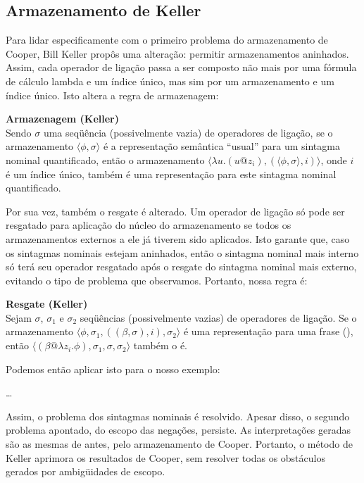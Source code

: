 \subsection{Armazenamento de Keller}
Para lidar especificamente com o primeiro problema do armazenamento de Cooper, Bill Keller propôs uma alteração: permitir armazenamentos aninhados. Assim, cada operador de ligação passa a ser composto não mais por uma fórmula de cálculo lambda e um índice único, mas sim por um armazenamento e um índice único. Isto altera a regra de armazenagem:

\begin{oframed}\textbf{Armazenagem (Keller)}\\
Sendo $\sigma$ uma seqüência (possivelmente vazia) de operadores de ligação, se o armazenamento $\langle\phi, \sigma\rangle$ é a representação semântica ``usual'' para um sintagma nominal quantificado, então o armazenamento $\langle\lambda u.(u@z_i), (\langle \phi, \sigma \rangle, i) \rangle $, onde $i$ é um índice único, também é uma representação para este sintagma nominal quantificado.
\end{oframed}

Por sua vez, também o resgate é alterado. Um operador de ligação só pode ser resgatado para aplicação do núcleo do armazenamento se todos os armazenamentos externos a ele já tiverem sido aplicados. Isto garante que, caso os sintagmas nominais estejam aninhados, então o sintagma nominal mais interno só terá seu operador resgatado após o resgate do sintagma nominal mais externo, evitando o tipo de problema que observamos. Portanto, nossa regra é:

\begin{oframed}\textbf{Resgate (Keller)}\\
Sejam $\sigma$, $\sigma_1$ e $\sigma_2$ seqüências (possivelmente vazias) de operadores de ligação. Se o armazenamento $\langle \phi, \sigma_1, ((\beta, \sigma), i), \sigma_2 \rangle$ é uma representação para uma frase (), então $\langle (\beta @ \lambda z_i . \phi ), \sigma_1, \sigma, \sigma_2 \rangle$ também o é.
\end{oframed}

Podemos então aplicar isto para o nosso exemplo:

\dots


Assim, o problema dos sintagmas nominais é resolvido. Apesar disso, o segundo problema apontado, do escopo das negações, persiste. As interpretações geradas são as mesmas de antes, pelo armazenamento de Cooper.  Portanto, o método de Keller aprimora os resultados de Cooper, sem resolver todas os obstáculos gerados por ambigüidades de escopo.

